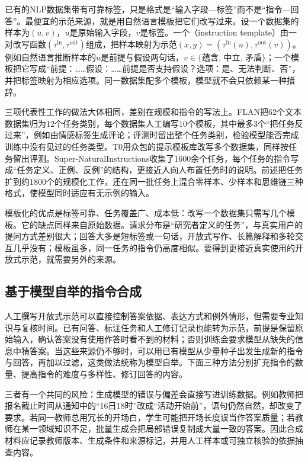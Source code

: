 已有的NLP数据集带有可靠标签，只是格式是“输入字段—标签”而不是“指令—回答”。最便宜的示范来源，就是用自然语言模板把它们改写过来。设一个数据集的样本为$(u,v)$，$u$是原始输入字段，$v$是标签。一个（instruction template）由一对改写函数$(\tau^{\mathrm{in}},\tau^{\mathrm{out}})$组成，把样本映射为示范$(x,y)=(\tau^{\mathrm{in}}(u),\tau^{\mathrm{out}}(v))$。例如自然语言推断样本的$u$是前提与假设两句话，$v\in\{$蕴含, 中立, 矛盾$\}$；一个模板把它写成“前提：……假设：……前提是否支持假设？选项：是、无法判断、否”，并把标签映射为相应选项。同一数据集配多个模板，模型就不会只依赖某一种措辞。

三项代表性工作的做法大体相同，差别在规模和指令的写法上。FLAN把62个文本数据集归为12个任务类别，每个数据集人工编写10个模板，其中最多3个“把任务反过来”，例如由情感标签生成评论；评测时留出整个任务类别，检验模型能否完成训练中没有见过的任务类型。T0用众包的提示模板库改写多个数据集，同样按任务留出评测。Super-NaturalInstructions收集了1600余个任务，每个任务的指令写成“任务定义、正例、反例”的结构，更接近人向人布置任务时的说明。前述把任务扩到约1800个的规模化工作，还在同一批任务上混合零样本、少样本和思维链三种格式，使模型同时适应有无示例的输入。

模板化的优点是标签可靠、任务覆盖广、成本低：改写一个数据集只需写几个模板。它的缺点同样来自原始数据。请求分布是“研究者定义的任务”，与真实用户的提问方式差别很大；回答大多是短标签或一句话，开放式写作、长篇解释和多轮交互几乎没有；模板虽多，同一任务的指令仍高度相似。要得到更接近真实使用的开放式示范，就需要另外的来源。

\subsection{基于模型自举的指令合成}
\label{sec:nlp-sft-acquisition}

人工撰写开放式示范可以直接控制答案依据、表达方式和例外情形，但需要专业知识与复核时间。已有问答、标注任务和人工修订记录也能转为示范，前提是保留原始输入，确认答案没有使用作答时看不到的材料；否则训练会要求模型从缺失的信息中猜答案。当这些来源仍不够时，可以用已有模型从少量种子出发生成新的指令与回答，再加以过滤，这类做法统称为模型自举。下面三种方法分别扩充指令的数量、提高指令的难度与多样性、修订回答的内容。

三者有一个共同的风险：生成模型的错误与偏差会直接写进训练数据。例如教师把报名截止时间从通知中的“16日18时”改成“活动开始前”，语句仍然自然，却改变了要求。若同一教师总用冗长的开场白，学生可能把开场长度误当作答案质量；若教师在某一领域知识不足，批量生成会把局部错误复制成大量一致的答案。因此合成材料应记录教师版本、生成条件和来源标记，并用人工样本或可独立核验的依据抽查内容。

